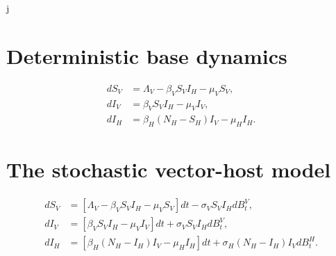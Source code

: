 j\documentclass{amsart}
\theoremstyle{plain}
\theoremstyle{definition}
\begin{document}
    \section{Deterministic base dynamics}
       \begin{equation}
           \begin{aligned}
               d S_V &= \Lambda_V - \beta_V S_V I_H - \mu_V S_V, \\
               d I_V &= \beta_V S_V I_H - \mu_V I_V, \\
               d I_H &= \beta_H (N_H - S_H) I_V - \mu_H I_H.
           \end{aligned}
       \end{equation}
%
%
%
    \section{The stochastic vector-host model}
       \begin{equation} \label{eqn:sto_vector_host}
            \begin{aligned}
                d S_V &= 
                    \left [
                        \Lambda_V - \beta_V S_V I_H - \mu_V S_V 
                    \right ] dt
                    - \sigma_V S_V I_H dB_t^V,
                    \\
                d I_V &= 
                    \left [
                       \beta_V S_V I_H - \mu_V I_V 
                    \right ]
                    dt 
                    + \sigma_V S_V I_H dB_t^V,
                    \\
                d I_H &= 
                    \left [
                        \beta_H (N_H - I_H) I_V - \mu_H I_H
                    \right ] dt
                    + \sigma_H (N_H - I_H) I_V d B^H_t .
           \end{aligned}
       \end{equation}
\end{document}
